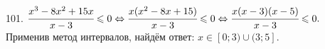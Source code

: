 101. $\cfrac{x^3-8x^2+15x}{x-3}\leqslant0\Leftrightarrow \cfrac{x(x^2-8x+15)}{x-3}\leqslant0\Leftrightarrow\cfrac{x(x-3)(x-5)}{x-3}\leqslant0.$ Применив метод интервалов, найдём ответ: $x\in[0;3)\cup(3;5].$
\begin{figure}[ht!]
\end{figure}
\newpage
